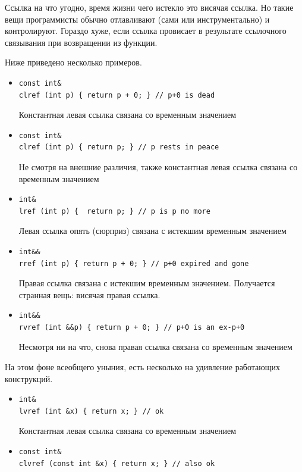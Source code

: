 \documentclass[a4paper,12pt,oneside]{article}
\begin{document}
Ссылка на что угодно, время жизни чего истекло это висячая ссылка. Но такие вещи программисты обычно отлавливают (сами или инструментально) и контролируют. Гораздо хуже, если ссылка провисает в результате ссылочного связывания при возвращении из функции.

Ниже приведено несколько примеров.

\begin{itemize}
\item
\begin{lstlisting}
const int& 
clref (int p) { return p + 0; } // p+0 is dead
\end{lstlisting}
Константная левая ссылка связана со временным значением
\item
\begin{lstlisting}
const int& 
clref (int p) { return p; } // p rests in peace 
\end{lstlisting}
Не смотря на внешние различия, также константная левая ссылка связана со временным значением
\item
\begin{lstlisting}
int& 
lref (int p) {  return p; } // p is p no more
\end{lstlisting}
Левая ссылка опять (сюрприз) связана с истекшим временным значением
\item
\begin{lstlisting}
int&& 
rref (int p) { return p + 0; } // p+0 expired and gone 
\end{lstlisting}
Правая ссылка связана с истекшим временным значением. Получается странная вещь: висячая правая ссылка.
\item
\begin{lstlisting}
int&& 
rvref (int &&p) { return p + 0; } // p+0 is an ex-p+0
\end{lstlisting}
Несмотря ни на что, снова правая ссылка связана со временным значением
\end{itemize}

На этом фоне всеобщего уныния, есть несколько на удивление работающих конструкций. 

\begin{itemize}
\item
\begin{lstlisting}
int& 
lvref (int &x) { return x; } // ok
\end{lstlisting}
Константная левая ссылка связана со временным значением
\item
\begin{lstlisting}
const int& 
clvref (const int &x) { return x; } // also ok
\end{lstlisting}
\end{itemize}
\end{document}

